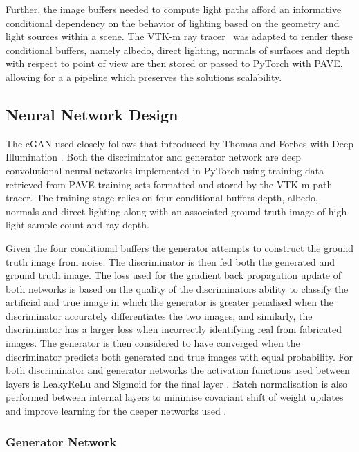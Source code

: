 Further, the image buffers needed to compute light paths afford an informative conditional dependency on the behavior of lighting based on the geometry and light sources within a scene. The VTK-m ray tracer~\cite{95260c8902184519bd98df42d2572515} was adapted to render these conditional buffers, namely albedo, direct lighting, normals of surfaces and depth with respect to point of view are then stored or passed to PyTorch with PAVE, allowing for a a pipeline which preserves the solutions scalability. 

\subsection{Neural Network Design}

The cGAN used closely follows that introduced by Thomas and Forbes with Deep Illumination \cite{deepillum}. Both the discriminator and generator network are deep convolutional neural networks implemented in PyTorch using training data retrieved from PAVE training sets formatted and stored by the VTK-m path tracer. The training stage relies on four conditional buffers depth, albedo, normals and direct lighting along with an associated ground truth image of high light sample count and ray depth. 

Given the four conditional buffers the generator attempts to construct the ground truth image from noise. The discriminator is then fed both the generated and ground truth image. The loss used for the gradient back propagation update of both networks is based on the quality of the discriminators ability to classify the artificial and true image in which the generator is greater penalised when the discriminator accurately differentiates the two images, and similarly, the discriminator has a larger loss when incorrectly identifying real from fabricated images. The generator is then considered to have converged when the discriminator predicts both generated and true images with equal probability. For both discriminator and generator networks the activation functions used between layers is LeakyReLu and Sigmoid for the final layer \cite{maasLeaky}. Batch normalisation is also performed between internal layers to minimise covariant shift of weight updates and improve learning for the deeper networks used \cite{ioffeBatch}.

\subsubsection{Generator Network}

